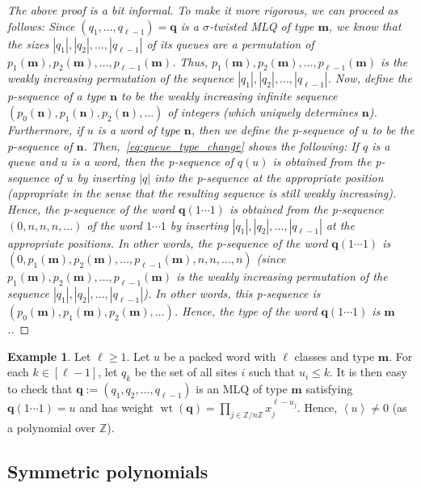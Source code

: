 \documentclass[reqno]{amsart}
\newcommand{\0}{\phantom{c}}
\newcommand{\swt}[1]{\left\langle #1 \right\rangle} %
\DeclareMathOperator{\wt}{wt} %
\newcommand{\mm}{\mathbf{m}}
\newcommand{\nn}{\mathbf{n}}
\newcommand{\qq}{\mathbf{q}}
\newcommand{\ZZ}{\mathbb{Z}}
\let\prodnonlimits\prod
\renewcommand{\prod}{\prodnonlimits\limits}
\newenvironment{verlong}{}{}
\newcommand{\abs}[1]{\left| #1 \right|}
\newcommand{\tup}[1]{\left( #1 \right)}
\newcommand{\ive}[1]{\left[ #1 \right]}
\newcommand{\defn}[1]{{\color{darkred}\emph{#1}}} %
\theoremstyle{plain}
\theoremstyle{definition}
\newtheorem{example}[thm]{Example}
\numberwithin{equation}{section}
\begin{document}
\begin{verlong}
\begin{proof}
[The above proof is a bit informal.
To make it more rigorous, we can proceed as follows: Since $\tup{q_1, \ldots, q_{\ell-1}} = \qq$ is a $\sigma$-twisted MLQ of type $\mm$, we know that the sizes $\abs{q_1}, \abs{q_2}, \ldots, \abs{q_{\ell-1}}$ of its queues are a permutation of $p_1(\mm), p_2(\mm), \ldots, p_{\ell-1}(\mm)$.
Thus, $p_1(\mm), p_2(\mm), \ldots, p_{\ell-1}(\mm)$ is the weakly increasing permutation of the sequence $\abs{q_1}, \abs{q_2}, \ldots, \abs{q_{\ell-1}}$.
Now, define the \defn{p-sequence} of a type $\nn$ to be the weakly increasing infinite sequence $\tup{p_0(\nn), p_1(\nn), p_2(\nn), \ldots}$ of integers (which uniquely determines $\nn$).
Furthermore, if $u$ is a word of type $\nn$, then we define the p-sequence of $u$ to be the p-sequence of $\nn$.
Then,~\eqref{eq:queue_type_change} shows the following: If $q$ is a queue and $u$ is a word, then the p-sequence of $q(u)$ is obtained from the p-sequence of $u$ by inserting $\abs{q}$ into the p-sequence at the appropriate position (appropriate in the sense that the resulting sequence is still weakly increasing).
Hence, the p-sequence of the word $\qq (1 \dotsm 1)$ is obtained from the p-sequence $\tup{0, n, n, n, \ldots}$ of the word $1 \dotsm 1$ by inserting $\abs{q_1}, \abs{q_2}, \ldots, \abs{q_{\ell-1}}$ at the appropriate positions.
In other words, the p-sequence of the word $\qq (1 \dotsm 1)$ is $\tup{0, p_1(\mm), p_2(\mm), \ldots, p_{\ell-1}(\mm), n, n, \ldots, n}$ (since $p_1(\mm), p_2(\mm), \ldots, p_{\ell-1}(\mm)$ is the weakly increasing permutation of the sequence $\abs{q_1}, \abs{q_2}, \ldots, \abs{q_{\ell-1}}$).
In other words, this p-sequence is $\tup{p_0(\mm), p_1(\mm), p_2(\mm), \ldots}$.
Hence, the type of the word $\qq (1 \dotsm 1)$ is $\mm$.]
\end{proof}
\end{verlong}

\begin{example}
Let $\ell \geq 1$.
Let $u$ be a packed word with $\ell$ classes and type $\mm$.
For each $k \in \ive{\ell-1}$, let $q_k$ be the set of all sites $i$ such that $u_i \leq k$.
It is then easy to check that $\qq := \tup{q_1, q_2, \ldots, q_{\ell-1}}$ is an
MLQ of type $\mm$ satisfying $\qq(1 \dotsm 1) = u$ and has weight
$\wt(\qq) = \prod_{j \in \ZZ / n \ZZ} x_j^{\ell - u_j}$.
Hence, $\swt{u} \neq 0$ (as a polynomial over $\ZZ$).
\end{example}




\subsection{Symmetric polynomials}
\end{document}
